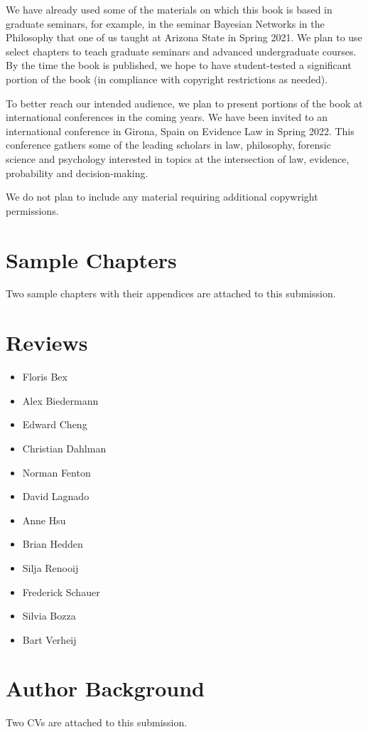 \documentclass[
  10pt,
  dvipsnames,enabledeprecatedfontcommands]{scrartcl}
\begin{document}
We have already used some of the materials on which this book is based
in graduate seminars, for example, in the seminar Bayesian Networks in
the Philosophy that one of us taught at Arizona State in Spring 2021. We
plan to use select chapters to teach graduate seminars and advanced
undergraduate courses. By the time the book is published, we hope to
have student-tested a significant portion of the book (in compliance
with copyright restrictions as needed).

To better reach our intended audience, we plan to present portions of
the book at international conferences in the coming years. We have been
invited to an international conference in Girona, Spain on Evidence Law
in Spring 2022. This conference gathers some of the leading scholars in
law, philosophy, forensic science and psychology interested in topics at
the intersection of law, evidence, probability and decision-making.

We do not plan to include any material requiring additional copywright
permissions.

\hypertarget{sample-chapters}{%
\section{Sample Chapters}\label{sample-chapters}}

Two sample chapters with their appendices are attached to this
submission.

\hypertarget{reviews}{%
\section{Reviews}\label{reviews}}

\begin{itemize}

\item Floris Bex

\item Alex Biedermann

\item Edward Cheng

\item Christian Dahlman

\item Norman Fenton

\item David Lagnado

\item Anne Hsu

\item Brian Hedden

\item Silja Renooij

\item Frederick Schauer

\item Silvia Bozza

\item Bart Verheij



\end{itemize}

\hypertarget{author-background}{%
\section{Author Background}\label{author-background}}

Two CVs are attached to this submission.
\end{document}
